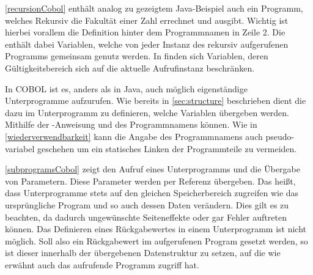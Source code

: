 \autoref{recursionCobol} enthält analog zu gezeigtem Java-Beispiel auch ein Programm, welches Rekursiv die Fakultät einer Zahl errechnet und ausgibt. Wichtig ist hierbei vorallem die  Definition hinter dem Programmnamen in Zeile 2. Die  enthält dabei Variablen, welche von jeder Instanz des rekursiv aufgerufenen Programms gemeinsam genutz werden. In  finden sich Variablen, deren Gültigkeitsbereich sich auf die aktuelle Aufrufinstanz beschränken.

In COBOL ist es, anders als in Java, auch möglich eigenständige Unterprogramme aufzurufen. Wie bereits in \autoref{sec:structure} beschrieben dient die  dazu im Unterprogramm zu definieren, welche Variablen übergeben werden. Mithilfe der -Anweisung und des Programmnamens können. Wie in \autoref{wiederverwendbarkeit} kann die Angabe des Programmnamens auch pseudo-variabel geschehen um ein statisches Linken der Programmteile zu vermeiden.


\autoref{subprogramsCobol} zeigt den Aufruf eines Unterprogramms und die Übergabe von Parametern. Diese Parameter werden per Referenz übergeben. Das heißt, dass Unterprogramme stets auf den gleichen Speicherbereich zugreifen wie das ursprüngliche Program und so auch dessen Daten verändern. Dies gilt es zu beachten, da dadurch ungewünschte Seiteneffekte oder gar Fehler auftreten können. Das Definieren eines Rückgabewertes in einem Unterprogramm ist nicht möglich. Soll also ein Rückgabewert im aufgerufenen Program gesetzt werden, so ist dieser innerhalb der übergebenen Datenstruktur zu setzen, auf die wie erwähnt auch das aufrufende Programm zugriff hat. 